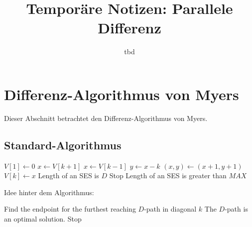 \documentclass[]{article}
\title{Temporäre Notizen: Parallele Differenz}
\author{tbd}
\begin{document}
\maketitle

\begin{abstract}
\end{abstract}

\section{Differenz-Algorithmus von Myers}
Dieser Abschnitt betrachtet den Differenz-Algorithmus von Myers.
\subsection{Standard-Algorithmus}
\begin{algorithm}
\begin{algorithmic}
	\State $V[1] \gets 0$
				\State $x\gets V[k+1]$
			\Else
				\State $x\gets V[k-1]$
			\EndIf
			\State $y\gets x-k$
				\State $(x,y) \gets (x+1, y+1)$
			\EndWhile
			\State $V[k] \gets x$
				\State Length of an SES is $D$
				\State Stop
			\EndIf
		\EndFor
	\EndFor
	\State Length of an SES is greater than $MAX$
\end{algorithmic}
\end{algorithm}

Idee hinter dem Algorithmus:
\begin{algorithm}
\begin{algorithmic}
			\State Find the endpoint for the furthest reaching $D$-path in diagonal $k$
				\State The $D$-path is an optimal solution.
				\State Stop
			\EndIf
		\EndFor
	\EndFor
\end{algorithmic}
\end{algorithm}
\end{document}
